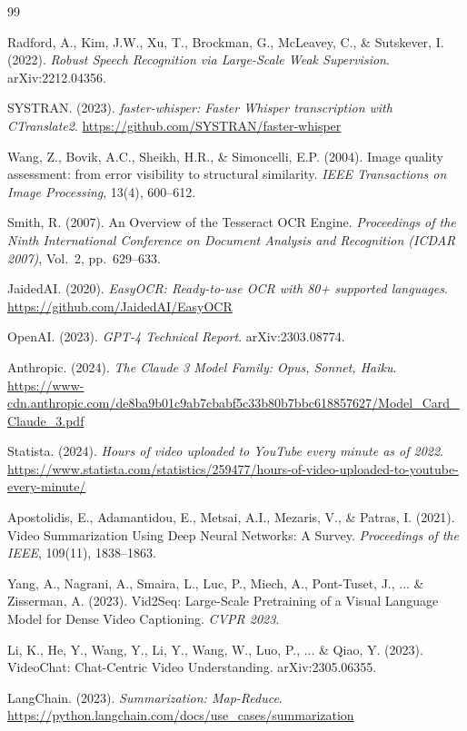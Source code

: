 \documentclass[12pt,a4paper]{article}
\begin{document}
\newpage
\begin{thebibliography}{99}

Radford, A., Kim, J.W., Xu, T., Brockman, G., McLeavey, C., \& Sutskever, I. (2022).
\textit{Robust Speech Recognition via Large-Scale Weak Supervision}.
arXiv:2212.04356.

SYSTRAN. (2023). \textit{faster-whisper: Faster Whisper transcription with CTranslate2}.
\url{https://github.com/SYSTRAN/faster-whisper}

Wang, Z., Bovik, A.C., Sheikh, H.R., \& Simoncelli, E.P. (2004).
Image quality assessment: from error visibility to structural similarity.
\textit{IEEE Transactions on Image Processing}, 13(4), 600--612.

Smith, R. (2007). An Overview of the Tesseract OCR Engine.
\textit{Proceedings of the Ninth International Conference on Document Analysis and
Recognition (ICDAR 2007)}, Vol.\ 2, pp.\ 629--633.

JaidedAI. (2020). \textit{EasyOCR: Ready-to-use OCR with 80+ supported languages}.
\url{https://github.com/JaidedAI/EasyOCR}

OpenAI. (2023). \textit{GPT-4 Technical Report}. arXiv:2303.08774.

Anthropic. (2024). \textit{The Claude 3 Model Family: Opus, Sonnet, Haiku}.
\url{https://www-cdn.anthropic.com/de8ba9b01c9ab7cbabf5c33b80b7bbc618857627/Model_Card_Claude_3.pdf}

Statista. (2024). \textit{Hours of video uploaded to YouTube every minute as of 2022}.
\url{https://www.statista.com/statistics/259477/hours-of-video-uploaded-to-youtube-every-minute/}

Apostolidis, E., Adamantidou, E., Metsai, A.I., Mezaris, V., \& Patras, I. (2021).
Video Summarization Using Deep Neural Networks: A Survey.
\textit{Proceedings of the IEEE}, 109(11), 1838--1863.

Yang, A., Nagrani, A., Smaira, L., Luc, P., Miech, A., Pont-Tuset, J., ... \& Zisserman, A. (2023).
Vid2Seq: Large-Scale Pretraining of a Visual Language Model for Dense Video Captioning.
\textit{CVPR 2023}.

Li, K., He, Y., Wang, Y., Li, Y., Wang, W., Luo, P., ... \& Qiao, Y. (2023).
VideoChat: Chat-Centric Video Understanding. arXiv:2305.06355.

LangChain. (2023). \textit{Summarization: Map-Reduce}.
\url{https://python.langchain.com/docs/use\_cases/summarization}

\end{thebibliography}
\end{document}
